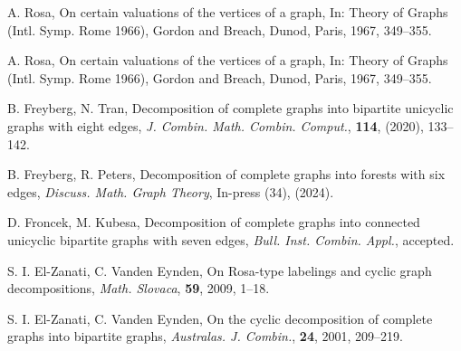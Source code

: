 \documentclass{dmgt}
\begin{document}
\begin{thebibliography}{20}

A. Rosa,
On certain valuations of the vertices of a graph,
In: Theory of Graphs (Intl. Symp. Rome 1966), Gordon and Breach, Dunod, Paris,
1967, 349--355.

A. Rosa,
On certain valuations of the vertices of a graph,
In: Theory of Graphs (Intl. Symp. Rome 1966), Gordon and Breach, Dunod, Paris,
1967, 349--355.

B. Freyberg, N. Tran, 
Decomposition of complete graphs into bipartite unicyclic graphs with eight edges, 
\textit{J. Combin. Math. Combin. Comput.}, \textbf{114}, (2020), 133--142.

B. Freyberg, R. Peters, 
Decomposition of complete graphs into forests with six edges, 
\textit{Discuss. Math. Graph Theory}, In-press (34), (2024).
    
D. Froncek, M. Kubesa, 
Decomposition of complete graphs into connected unicyclic bipartite graphs with seven edges,
\textit{Bull. Inst. Combin. Appl.}, accepted.


S. I. El-Zanati, C. Vanden Eynden,
On Rosa-type labelings and cyclic graph decompositions,
\textit{Math. Slovaca}, \textbf{59}, 2009, 1--18.

S. I. El-Zanati, C. Vanden Eynden,
On the cyclic decomposition of complete graphs into bipartite graphs,
\textit{Australas. J. Combin.}, \textbf{24}, 2001, 209--219.

\end{thebibliography}
\end{document}
